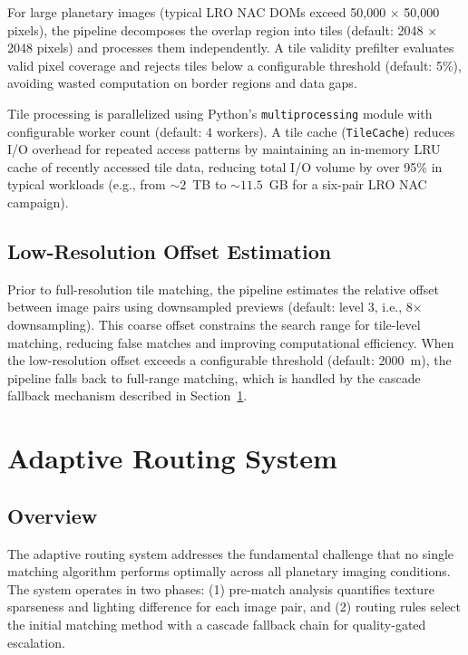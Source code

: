 \documentclass[lettersize,journal]{IEEEtran}
\begin{document}
For large planetary images (typical LRO NAC DOMs exceed 50,000 $\times$ 50,000 pixels), the pipeline decomposes the overlap region into tiles (default: 2048 $\times$ 2048 pixels) and processes them independently. A tile validity prefilter evaluates valid pixel coverage and rejects tiles below a configurable threshold (default: 5\%), avoiding wasted computation on border regions and data gaps.

Tile processing is parallelized using Python's \texttt{multiprocessing} module with configurable worker count (default: 4 workers). A tile cache (\texttt{TileCache}) reduces I/O overhead for repeated access patterns by maintaining an in-memory LRU cache of recently accessed tile data, reducing total I/O volume by over 95\% in typical workloads (e.g., from ${\sim}2$~TB to ${\sim}11.5$~GB for a six-pair LRO NAC campaign).

\subsection{Low-Resolution Offset Estimation}

Prior to full-resolution tile matching, the pipeline estimates the relative offset between image pairs using downsampled previews (default: level 3, i.e., 8$\times$ downsampling). This coarse offset constrains the search range for tile-level matching, reducing false matches and improving computational efficiency. When the low-resolution offset exceeds a configurable threshold (default: 2000~m), the pipeline falls back to full-range matching, which is handled by the cascade fallback mechanism described in Section~\ref{sec:routing}.


\section{Adaptive Routing System}\label{sec:routing}

\subsection{Overview}

The adaptive routing system addresses the fundamental challenge that no single matching algorithm performs optimally across all planetary imaging conditions. The system operates in two phases: (1) pre-match analysis quantifies texture sparseness and lighting difference for each image pair, and (2) routing rules select the initial matching method with a cascade fallback chain for quality-gated escalation.
\end{document}
